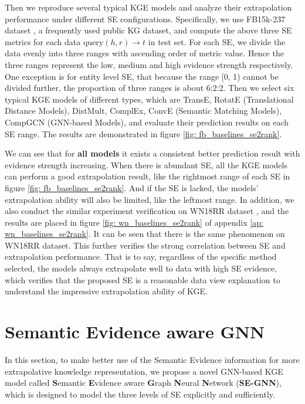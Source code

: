 \documentclass[letterpaper]{article} \usepackage{aaai22}  \usepackage{times}  \usepackage{helvet}  \usepackage{courier}  \usepackage[hyphens]{url}  \usepackage{graphicx} \urlstyle{rm} \def\UrlFont{\rm}  \usepackage{natbib}  \usepackage{caption} \DeclareCaptionStyle{ruled}{labelfont=normalfont,labelsep=colon,strut=off} \frenchspacing  \setlength{\pdfpagewidth}{8.5in}  \setlength{\pdfpageheight}{11in}  \usepackage{algorithm}
\begin{document}
Then we reproduce several typical KGE models and analyze their extrapolation performance under different SE configurations. Specifically, we use FB15k-237 dataset \cite{2015_Toutanova_FB15k-237}, a frequently used public KG dataset, and compute the above three SE metrics for each data $\mathrm{query}(h, r) \rightarrow t$ in test set. For each SE, we divide the data evenly into three ranges with ascending order of metric value. Hence the three ranges represent the low, medium and high evidence strength respectively. 
One exception is for entity level SE, that because the range [0, 1) cannot be divided further, the proportion of three ranges is about 6:2:2.
Then we select six typical KGE models of different types, which are TransE, RotatE (Translational Distance Models), DistMult, ComplEx, ConvE (Semantic Matching Models), CompGCN (GNN-based Models), and evaluate their prediction results on each SE range. The results are demonstrated in figure \ref{fig: fb_baselines_se2rank}. 

We can see that for \textbf{all models} it exists a consistent better prediction result with evidence strength increasing. When there is abundant SE, all the KGE models can perform a good extrapolation result, like the rightmost range of each SE in figure \ref{fig: fb_baselines_se2rank}. And if the SE is lacked, the models' extrapolation ability will also be limited, like the leftmost range. 
In addition, we also conduct the similar experiment verification on WN18RR dataset \cite{AAAI_2018_Dettmers_ConvE_WN18RR}, and the results are placed in figure \ref{fig: wn_baselines_se2rank} of appendix \ref{ap: wn_baselines_se2rank}. It can be seen that there is the same phenomenon on WN18RR dataset. 
This further verifies the strong correlation between SE and extrapolation performance. That is to say, regardless of the specific method selected, the models always extrapolate well to data with high SE evidence, which verifies that the proposed SE is a reasonable data view explanation to understand the impressive extrapolation ability of KGE.

\section{Semantic Evidence aware GNN}
In this section, to make better use of the Semantic Evidence information for more extrapolative knowledge representation, we propose a novel GNN-based KGE model called \textbf{S}emantic \textbf{E}vidence aware \textbf{G}raph \textbf{N}eural \textbf{N}etwork (\textbf{SE-GNN}), which is designed to model the three levels of SE explicitly and sufficiently. 
\end{document}
